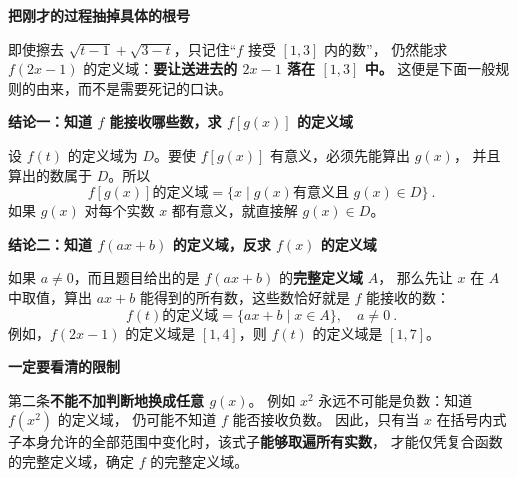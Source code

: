 \clearpage
\begin{statementbox}
\textbf{\textcolor{CStatement}{把刚才的过程抽掉具体的根号}}

即使擦去 $\sqrt{t-1}+\sqrt{3-t}$，只记住“$f$ 接受 $[1,3]$ 内的数”，
仍然能求 $f(2x-1)$ 的定义域：\textbf{要让送进去的 $2x-1$ 落在 $[1,3]$ 中。}
这便是下面一般规则的由来，而不是需要死记的口诀。

\medskip

\textbf{\textcolor{CStatement}{结论一：知道 $f$ 能接收哪些数，求 $f[g(x)]$ 的定义域}}

设 $f(t)$ 的定义域为 $D$。要使 $f[g(x)]$ 有意义，必须先能算出 $g(x)$，
并且算出的数属于 $D$。所以
\[
 \boxed{\ f[g(x)]\text{的定义域}=\{x\mid g(x)\text{有意义且 }g(x)\in D\}\ }.
\]
如果 $g(x)$ 对每个实数 $x$ 都有意义，就直接解 $g(x)\in D$。

\medskip
\textbf{\textcolor{CStatement}{结论二：知道 $f(ax+b)$ 的定义域，反求 $f(x)$ 的定义域}}

如果 $a\ne0$，而且题目给出的是 $f(ax+b)$ 的\textbf{完整定义域} $A$，
那么先让 $x$ 在 $A$ 中取值，算出 $ax+b$ 能得到的所有数，这些数恰好就是 $f$ 能接收的数：
\[
 \boxed{\ f(t)\text{的定义域}=\{ax+b\mid x\in A\},\quad a\ne0\ }.
\]
例如，$f(2x-1)$ 的定义域是 $[1,4]$，则 $f(t)$ 的定义域是 $[1,7]$。

\medskip
\textbf{\textcolor{CStatement}{一定要看清的限制}}

第二条\textbf{不能不加判断地换成任意 $g(x)$}。
例如 $x^2$ 永远不可能是负数：知道 $f(x^2)$ 的定义域，
仍可能不知道 $f$ 能否接收负数。
因此，只有当 $x$ 在括号内式子本身允许的全部范围中变化时，该式子\textbf{能够取遍所有实数}，
才能仅凭复合函数的完整定义域，确定 $f$ 的完整定义域。
\end{statementbox}

